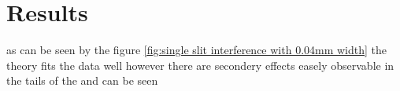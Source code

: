 \section{Results}
as can be seen by the figure \ref{fig:single slit interference with 0.04mm width} the theory fits the data well however there are
secondery effects easely observable in the tails of the and can be seen




